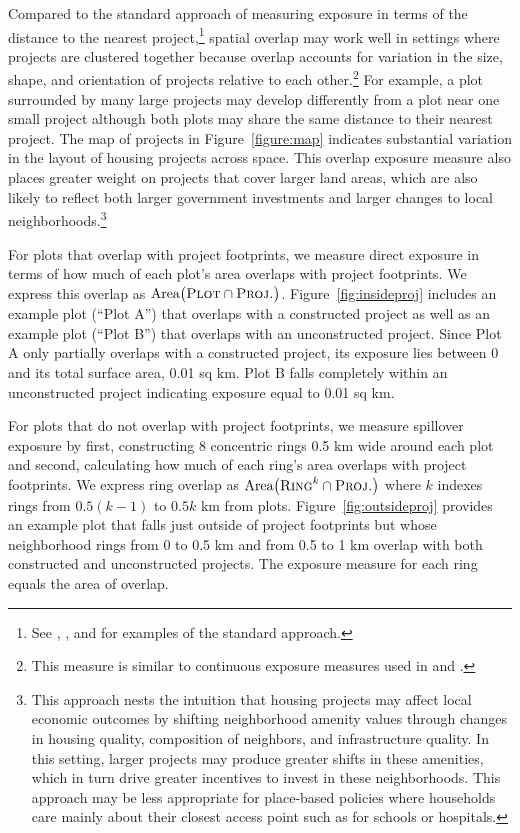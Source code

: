 \documentclass[12pt]{article}
\newcommand{\rv}{}
\begin{document}
Compared to the standard approach of measuring exposure in terms of the distance to the nearest project,\footnote{See \cite{diamond2019wants}, \cite{rossi2010housing}, and \cite{neumark2015place} for examples of the standard approach.} \rv{spatial overlap may work well in settings where projects are clustered together because overlap accounts for variation in the size, shape, and orientation of projects relative to each other.\footnote{\rv{This measure is similar to continuous exposure measures used in \cite{autor2014housing} and \cite{gechter2020spatial}.}}}  For example, a plot surrounded by many large projects may develop differently from a plot near one small project although both plots may share the same distance to their nearest project.  The map of projects in Figure~\ref{figure:map} indicates substantial variation in the layout of housing projects across space.  This overlap exposure measure also places greater weight on projects that cover larger land areas, which are also likely to reflect both larger government investments and larger changes to local neighborhoods.\footnote{This approach nests the intuition that housing projects may affect local economic outcomes by shifting neighborhood amenity values through changes in housing quality, composition of neighbors, and infrastructure quality.  In this setting, larger projects may produce greater shifts in these amenities, which in turn drive greater incentives to invest in these neighborhoods.  This approach may be less appropriate for place-based policies where households care mainly about their closest access point such as for schools or hospitals.}

\rv{For plots that overlap with project footprints, we measure direct exposure in terms of how much of each plot's area overlaps with project footprints.  We express this overlap as $\text{Area}\big(\textsc{Plot}  \cap  \textsc{Proj.}\big)$.  Figure~\ref{fig:insideproj} includes an example plot (``Plot A'') that overlaps with a constructed project as well as an example plot (``Plot B'') that overlaps with an unconstructed project.  Since Plot A only partially overlaps with a constructed project, its exposure lies between 0 and its total surface area, 0.01 sq km.  Plot B falls completely within an unconstructed project indicating exposure equal to 0.01 sq km. } 

\rv{For plots that do not overlap with project footprints, we measure spillover exposure by first, constructing 8 concentric rings 0.5 km wide around each plot and second, calculating how much of each ring's area overlaps with project footprints.  We express ring overlap as $\text{Area}\big(\textsc{Ring}^{k}  \cap  \textsc{Proj.}\big)$ where $k$ indexes rings from $0.5(k-1)$ to $0.5k$ km from plots.  Figure~\ref{fig:outsideproj} provides an example plot that falls just outside of project footprints but whose neighborhood rings from 0 to 0.5 km and from 0.5 to 1 km overlap with both constructed and unconstructed projects.  The exposure measure for each ring equals the area of overlap.}
\end{document}
